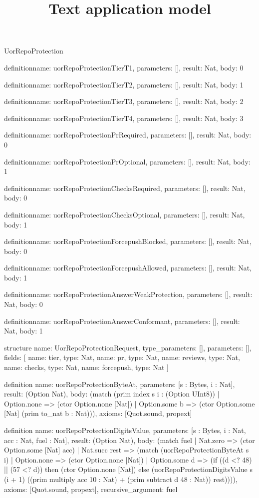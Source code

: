 \begin{lexlean}{UorRepoProtection}
\title{Text application model}
\begin{semanticmodule}
definition{name: uorRepoProtectionTierT1, parameters: [], result: Nat, body: 0}

definition{name: uorRepoProtectionTierT2, parameters: [], result: Nat, body: 1}

definition{name: uorRepoProtectionTierT3, parameters: [], result: Nat, body: 2}

definition{name: uorRepoProtectionTierT4, parameters: [], result: Nat, body: 3}

definition{name: uorRepoProtectionPrRequired, parameters: [], result: Nat, body: 0}

definition{name: uorRepoProtectionPrOptional, parameters: [], result: Nat, body: 1}

definition{name: uorRepoProtectionChecksRequired, parameters: [], result: Nat, body: 0}

definition{name: uorRepoProtectionChecksOptional, parameters: [], result: Nat, body: 1}

definition{name: uorRepoProtectionForcepushBlocked, parameters: [], result: Nat, body: 0}

definition{name: uorRepoProtectionForcepushAllowed, parameters: [], result: Nat, body: 1}

definition{name: uorRepoProtectionAnswerWeakProtection, parameters: [], result: Nat, body: 0}

definition{name: uorRepoProtectionAnswerConformant, parameters: [], result: Nat, body: 1}

structure{
  name: UorRepoProtectionRequest,
  type_parameters: [],
  parameters: [],
  fields: [
    {name: tier, type: Nat},
    {name: pr, type: Nat},
    {name: reviews, type: Nat},
    {name: checks, type: Nat},
    {name: forcepush, type: Nat}
  ]
}

definition{
  name: uorRepoProtectionByteAt,
  parameters: [s : Bytes, i : Nat],
  result: (Option Nat),
  body: (match (prim index s i : (Option UInt8))
    | Option.none => (ctor Option.none [Nat])
    | Option.some b => (ctor Option.some [Nat] (prim to_nat b : Nat))),
  axioms: [Quot.sound, propext]
}

definition{
  name: uorRepoProtectionDigitsValue,
  parameters: [s : Bytes, i : Nat, acc : Nat, fuel : Nat],
  result: (Option Nat),
  body: (match fuel
    | Nat.zero => (ctor Option.some [Nat] acc)
    | Nat.succ rest => (match (uorRepoProtectionByteAt s i)
      | Option.none => (ctor Option.none [Nat])
      | Option.some d => (if ((d <? 48) || (57 <? d)) then (ctor Option.none [Nat]) else (uorRepoProtectionDigitsValue s (i + 1) ((prim multiply acc 10 : Nat) + (prim subtract d 48 : Nat)) rest)))),
  axioms: [Quot.sound, propext],
  recursive_argument: fuel
}


\end{semanticmodule}
\end{lexlean}
